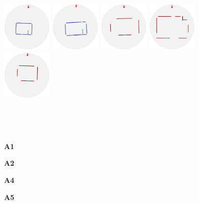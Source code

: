 \begin{figure}[t]
\begin{center}
\begin{minipage}[b]{4.9in}
  \includegraphics[width=0.95in]{../gi2012_userstudy/images/section2/3_2D_walls_rotate} %
  \includegraphics[width=0.95in]{../gi2012_userstudy/images/section2/5_2D_walls_rotate} %
  \includegraphics[width=0.95in]{../gi2012_userstudy/images/section2/9_2D_walls_rotate} %
  \includegraphics[width=0.95in]{../gi2012_userstudy/images/section2/10_2D_walls_rotate} %
  \includegraphics[width=0.95in]{../gi2012_userstudy/images/section2/11_2D_walls_rotate} %
\end{minipage}
\vspace{-1.12in}
\\
\begin{minipage}{1.92in}~\end{minipage}
\begin{minipage}{0.95in}{\bf A1}\end{minipage}
\begin{minipage}{0.95in}{\bf A2}\end{minipage}
\begin{minipage}{0.95in}{\bf A4}\end{minipage}
\begin{minipage}{0.95in}{\bf A5}\end{minipage}

\end{center}
\end{figure}
